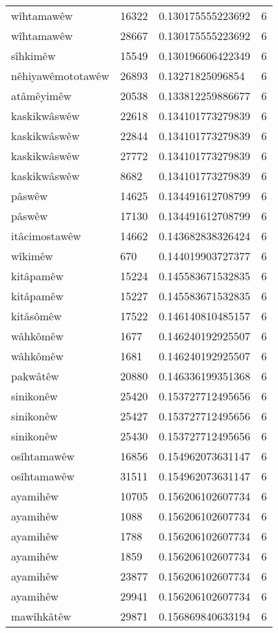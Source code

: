 \begin{longtable}{llll}
wîhtamawêw & 16322 & 0.130175555223692 & 6\\
wîhtamawêw & 28667 & 0.130175555223692 & 6\\
sîhkimêw & 15549 & 0.130196606422349 & 6\\
nêhiyawêmototawêw & 26893 & 0.13271825096854 & 6\\
atâmêyimêw & 20538 & 0.133812259886677 & 6\\
kaskikwâswêw & 22618 & 0.134101773279839 & 6\\
kaskikwâswêw & 22844 & 0.134101773279839 & 6\\
kaskikwâswêw & 27772 & 0.134101773279839 & 6\\
kaskikwâswêw & 8682 & 0.134101773279839 & 6\\
pâswêw & 14625 & 0.134491612708799 & 6\\
pâswêw & 17130 & 0.134491612708799 & 6\\
itâcimostawêw & 14662 & 0.143682838326424 & 6\\
wîkimêw & 670 & 0.144019903727377 & 6\\
kitâpamêw & 15224 & 0.145583671532835 & 6\\
kitâpamêw & 15227 & 0.145583671532835 & 6\\
kitâsômêw & 17522 & 0.146140810485157 & 6\\
wâhkômêw & 1677 & 0.146240192925507 & 6\\
wâhkômêw & 1681 & 0.146240192925507 & 6\\
pakwâtêw & 20880 & 0.146336199351368 & 6\\
sinikonêw & 25420 & 0.153727712495656 & 6\\
sinikonêw & 25427 & 0.153727712495656 & 6\\
sinikonêw & 25430 & 0.153727712495656 & 6\\
osîhtamawêw & 16856 & 0.154962073631147 & 6\\
osîhtamawêw & 31511 & 0.154962073631147 & 6\\
ayamihêw & 10705 & 0.156206102607734 & 6\\
ayamihêw & 1088 & 0.156206102607734 & 6\\
ayamihêw & 1788 & 0.156206102607734 & 6\\
ayamihêw & 1859 & 0.156206102607734 & 6\\
ayamihêw & 23877 & 0.156206102607734 & 6\\
ayamihêw & 29941 & 0.156206102607734 & 6\\
mawîhkâtêw & 29871 & 0.156869840633194 & 6\\

\end{longtable}
